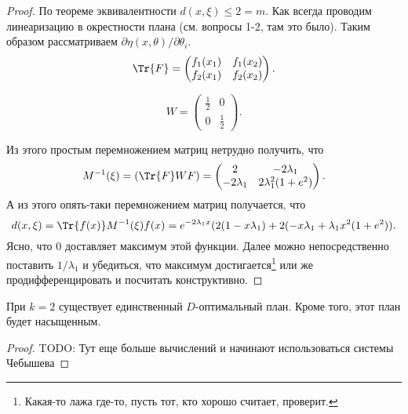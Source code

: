 \begin{proof}
По теореме эквивалентности $d(x, \xi) \leq 2 = m$.
Как всегда проводим линеаризацию в окрестности плана (см. вопросы 1-2, там это было).
Таким образом рассматриваем $\partial \eta(x, \theta) / \partial \theta_i$.
$$\Tr{F} = \begin{pmatrix} f_1(x_1) & f_1(x_2) \\ f_2(x_1) & f_2(x_2)\end{pmatrix}.$$

$$ W = \begin{pmatrix} \frac{1}{2} & 0 \\ 0 & \frac{1}{2} \end{pmatrix}.$$

Из этого простым перемножением матриц нетрудно получить, что
$$ M^{-1}(\xi) = (\Tr{F} W F) = \begin{pmatrix} 2 & -2\lambda_1 \\  -2\lambda_1 & 2 \lambda_1^2 (1 + e^2) \end{pmatrix}.$$
А из этого опять-таки перемножением матриц получается, что
$$ d(x, \xi) = \Tr{f(x)} M^{-1}(\xi) f(x) = e^{-2\lambda_1 x} (2 (1 - x \lambda_1) + 2(-x\lambda_1 + \lambda_1 x^2(1 +e^2)).$$
Ясно, что $0$ доставляет максимум этой функции. Далее можно непосредственно поставить $1 / \lambda_1$ и убедиться, что максимум достигается\footnote{\color{blue} Какая-то лажа где-то, пусть тот, кто хорошо считает, проверит.}
или же продифференцировать и посчитать конструктивно.
\end{proof}

\begin{thm}
При $k=2$ существует единственный $D$-оптимальный план. Кроме того, этот план будет насыщенным.
\end{thm}


\begin{proof}
{\color{blue} TODO: Тут еще больше вычислений и начинают использоваться системы Чебышева}
\end{proof}
